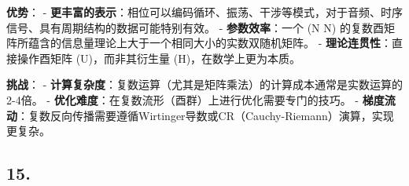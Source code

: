 \documentclass[
  12pt,
]{article}
\begin{document}
\textbf{优势}： -
\textbf{更丰富的表示}：相位可以编码循环、振荡、干涉等模式，对于音频、时序信号、具有周期结构的数据可能特别有效。
- \textbf{参数效率}：一个 (N \times N)
的复数酉矩阵所蕴含的信息量理论上大于一个相同大小的实数双随机矩阵。 -
\textbf{理论连贯性}：直接操作酉矩阵 (U)，而非其衍生量
(H)，在数学上更为本质。

\textbf{挑战}： -
\textbf{计算复杂度}：复数运算（尤其是矩阵乘法）的计算成本通常是实数运算的2-4倍。
- \textbf{优化难度}：在复数流形（酉群）上进行优化需要专门的技巧。 -
\textbf{梯度流动}：复数反向传播需要遵循Wirtinger导数或CR（Cauchy-Riemann）演算，实现更复杂。

\hypertarget{section}{%
\subsection{15.}\label{section}}
\end{document}
